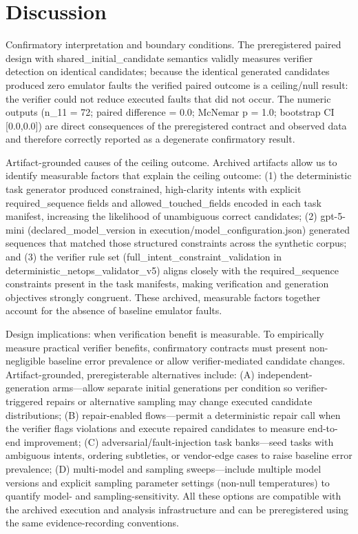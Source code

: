 \documentclass[conference]{IEEEtran}
\begin{document}
\section{Discussion}
Confirmatory interpretation and boundary conditions. The preregistered paired design with shared\_initial\_candidate semantics validly measures verifier detection on identical candidates; because the identical generated candidates produced zero emulator faults the verified paired outcome is a ceiling/null result: the verifier could not reduce executed faults that did not occur. The numeric outputs (n\_11 = 72; paired difference = 0.0; McNemar p = 1.0; bootstrap CI [0.0,0.0]) are direct consequences of the preregistered contract and observed data and therefore correctly reported as a degenerate confirmatory result.

Artifact-grounded causes of the ceiling outcome. Archived artifacts allow us to identify measurable factors that explain the ceiling outcome: (1) the deterministic task generator produced constrained, high-clarity intents with explicit required\_sequence fields and allowed\_touched\_fields encoded in each task manifest, increasing the likelihood of unambiguous correct candidates; (2) gpt-5-mini (declared\_model\_version in execution/model\_configuration.json) generated sequences that matched those structured constraints across the synthetic corpus; and (3) the verifier rule set (full\_intent\_constraint\_validation in deterministic\_netops\_validator\_v5) aligns closely with the required\_sequence constraints present in the task manifests, making verification and generation objectives strongly congruent. These archived, measurable factors together account for the absence of baseline emulator faults.

Design implications: when verification benefit is measurable. To empirically measure practical verifier benefits, confirmatory contracts must present non-negligible baseline error prevalence or allow verifier-mediated candidate changes. Artifact-grounded, preregisterable alternatives include: (A) independent-generation arms---allow separate initial generations per condition so verifier-triggered repairs or alternative sampling may change executed candidate distributions; (B) repair-enabled flows---permit a deterministic repair call when the verifier flags violations and execute repaired candidates to measure end-to-end improvement; (C) adversarial/fault-injection task banks---seed tasks with ambiguous intents, ordering subtleties, or vendor-edge cases to raise baseline error prevalence; (D) multi-model and sampling sweeps---include multiple model versions and explicit sampling parameter settings (non-null temperatures) to quantify model- and sampling-sensitivity. All these options are compatible with the archived execution and analysis infrastructure and can be preregistered using the same evidence-recording conventions.
\end{document}
